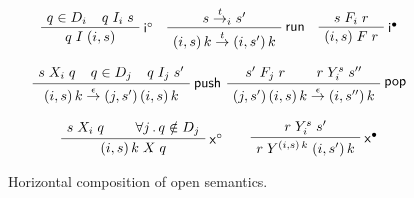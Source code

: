 \documentclass[sigplan,screen,review]{acmart}
\newcommand{\figsize}{\small}
\newcommand{\kw}[1]{\ensuremath{ \mathsf{#1} }}
\newcommand{\que}{\circ}
\newcommand{\ans}{\bullet}
\begin{document}
\begin{figure} %
  \figsize
    \begin{gather*}
        \AxiomC{$q \in D_i$}
        \AxiomC{\hspace{-1.5em} $q \mathrel{I_i} s$}
        \RightLabel{$\kw{i}^\que$}
        \BinaryInfC{$q \mathrel{I} (i, s)$}
        \DisplayProof
        \quad
        \AxiomC{$s \stackrel{t}{\rightarrow}_i s'$}
        \RightLabel{$\kw{run}$}
        \UnaryInfC{$
            (i, s) \, k
            \stackrel{t}{\rightarrow}
            (i, s') \, k$}
        \DisplayProof
        \quad
        \AxiomC{$s \mathrel{F_i} r$}
        \RightLabel{$\kw{i}^\ans$}
        \UnaryInfC{$(i, s) \mathrel{F} r$}
        \DisplayProof
        \\[0.8em]
        \AxiomC{$s \mathrel{X_i} q$}
        \AxiomC{\hspace{-1.5em} $q \in D_j$}
        \AxiomC{\hspace{-1.5em} $q \mathrel{I_j} s'$}
        \RightLabel{$\kw{push}$}
        \TrinaryInfC{$
            (i, s) \, k
            \stackrel{\epsilon}{\rightarrow}
            (j, s') \, (i, s) \, k$}
        \DisplayProof
        \:\:
        \AxiomC{$s' \mathrel{F_j} r$}
        \AxiomC{$r \mathrel{Y_i^s} s''$}
        \RightLabel{$\kw{pop}$}
        \BinaryInfC{$
            (j, s') \, (i, s) \, k
            \stackrel{\epsilon}{\rightarrow}
            (i, s'') \, k$}
        \DisplayProof
        \\[0.8em]
        \AxiomC{$s \mathrel{X_i} q$}
        \AxiomC{$\forall j \,.\, q \notin D_j$}
        \RightLabel{$\kw{x}^\que$}
        \BinaryInfC{$(i, s) \, k \mathrel{X} q$}
        \DisplayProof
        \qquad
        \AxiomC{$r \mathrel{Y_i^s} s'$}
        \RightLabel{$\kw{x}^\ans$}
        \UnaryInfC{$r \mathrel{Y^{(i, s) \, k}} (i, s') \, k$}
        \DisplayProof
    \end{gather*}
    \caption{Horizontal composition of open semantics.}
    \label{fig:hcomp}
\end{figure}
\end{document}
